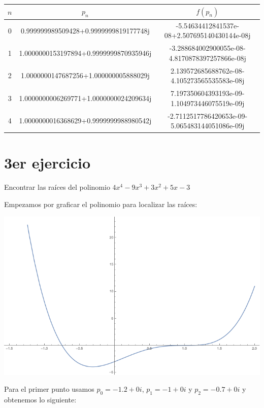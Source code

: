 \documentclass{article}
\begin{document}
\begin{center}
    \begin{tabular}{||c c c||} 
    \hline
    $n$ & $p_{n}$ & $f(p_n)$ \\ [0.5ex] 
    \hline
    0 & 0.999999989509428+0.9999999819177748j & -5.54634412841537e-08+2.507695140430144e-08j\\
    \hline
    1 & 1.0000000153197894+0.9999999870935946j & -3.288684002900055e-08-4.8170878397257866e-08j\\
    \hline
    2 & 1.0000000147687256+1.000000005888029j & 2.139572685688762e-08-4.105273565535583e-08j \\
    \hline
    3 & 1.0000000006269771+1.0000000024209634j & 7.197350604393193e-09-1.104973446075519e-09j \\ 
    \hline
    4 & 1.0000000016368629+0.9999999988980542j & -2.7112517786420653e-09-5.065483144051086e-09j \\ [1ex]
    \hline
   \end{tabular}
\end{center}


\section{3er ejercicio}
Encontrar las raíces del polinomio $4x^4 -9x^3 + 3x^2 +5x -3$

Empezamos por graficar el polinomio para localizar las raíces:
\begin{center}
    \includegraphics[scale=0.5]{grafica3.png}    
\end{center}

Para el primer punto usamos $p_0 = -1.2 + 0i$, $p_1 = -1 + 0i$ y $p_2 = -0.7 + 0i$ y obtenemos lo siguiente:
\end{document}
